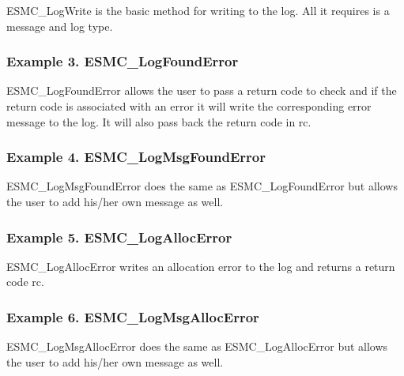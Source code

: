 ESMC\_LogWrite is the basic method for writing to the log.  All it requires is a
message and log type.

\subsubsection{Example 3. ESMC\_LogFoundError}

ESMC\_LogFoundError allows the user to pass a return code to check and if the 
return code is associated with an error it will write the corresponding error
message to the log.  It will also pass back the return code in rc.

\subsubsection{Example 4. ESMC\_LogMsgFoundError}

ESMC\_LogMsgFoundError does the same as ESMC\_LogFoundError but allows the user
to add his/her own message as well.

\subsubsection{Example 5. ESMC\_LogAllocError}

ESMC\_LogAllocError writes an allocation error to the log and returns a return
code rc.

\subsubsection{Example 6. ESMC\_LogMsgAllocError}

ESMC\_LogMsgAllocError does the same as ESMC\_LogAllocError but allows the user
to add his/her own message as well.
